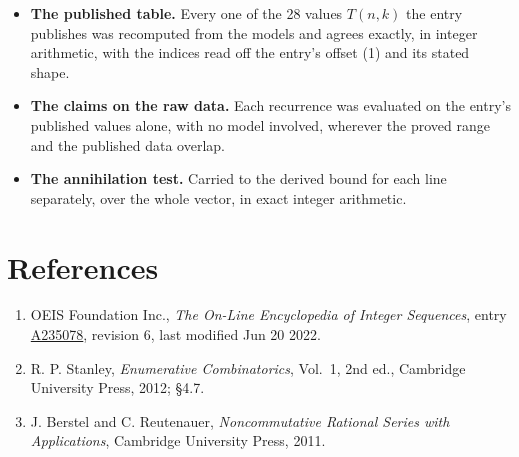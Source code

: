 \documentclass[11pt]{article}
\theoremstyle{definition}
\begin{document}
\begin{itemize}

\item {\bfseries The published table.} Every one of the 28 values $T(n,k)$ the entry publishes was recomputed from the models and agrees exactly, in integer arithmetic, with the indices read off the entry's offset (1) and its stated shape.

\item {\bfseries The claims on the raw data.} Each recurrence was evaluated on the entry's published values alone, with no model involved, wherever the proved range and the published data overlap.

\item {\bfseries The annihilation test.} Carried to the derived bound for each line separately, over the whole vector, in exact integer arithmetic.

\end{itemize}

\section{References}

\begin{enumerate}

\item OEIS Foundation Inc., \emph{The On-Line Encyclopedia of Integer Sequences}, entry \href{https://oeis.org/A235078}{A235078}, revision 6, last modified Jun 20 2022.

\item R. P. Stanley, \emph{Enumerative Combinatorics}, Vol.~1, 2nd ed., Cambridge University Press, 2012; \S4.7.

\item J. Berstel and C. Reutenauer, \emph{Noncommutative Rational Series with Applications}, Cambridge University Press, 2011.

\end{enumerate}
\end{document}
